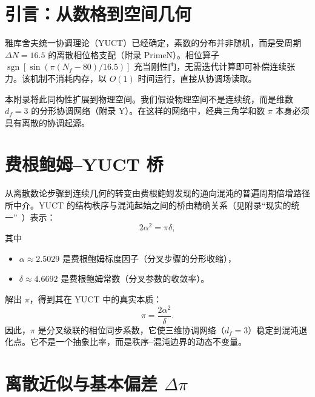 \documentclass[12pt,a4paper]{article}
\newcommand{\df}{d_{\!f}}
\begin{document}
	\tableofcontents
	\newpage
	
	\section{引言：从数格到空间几何}
	
	雅库舍夫统一协调理论（YUCT）已经确定，素数的分布并非随机，而是受周期 $\Delta N = 16.5$ 的离散相位格支配（附录 PrimeN）。相位算子 $\operatorname{sgn}[\sin(\pi(N_f-80)/16.5)]$ 充当刚性门，无需迭代计算即可补偿连续张力。该机制不消耗内存，以 $O(1)$ 时间运行，直接从协调场读取。
	
	本附录将此同构性扩展到物理空间。我们假设物理空间不是连续统，而是维数 $\df=3$ 的分形协调网络（附录 Y）。在这样的网络中，经典三角学和数 $\pi$ 本身必须具有离散的协调起源。
	
	\section{费根鲍姆–YUCT 桥}
	\label{sec:bridge}
	
	从离散数论步骤到连续几何的转变由费根鲍姆发现的通向混沌的普遍周期倍增路径所中介。YUCT 的结构秩序与混沌起始之间的桥由精确关系（见附录“现实的统一”~\cite{UnityReality}）表示：
	\begin{equation}
		2\alpha^2 = \pi\delta,
		\label{eq:bridge}
	\end{equation}
	其中
	\begin{itemize}
		\item $\alpha \approx 2.5029$ 是费根鲍姆标度因子（分叉步骤的分形收缩），
		\item $\delta \approx 4.6692$ 是费根鲍姆常数（分叉参数的收敛率）。
	\end{itemize}
	解出 $\pi$，得到其在 YUCT 中的真实本质：
	\begin{equation}
		\boxed{\pi = \frac{2\alpha^2}{\delta}}.
		\label{eq:pi-from-feigenbaum}
	\end{equation}
	因此，$\pi$ 是分叉级联的相位同步系数，它使三维协调网络（$\df=3$）稳定到混沌退化点。它不是一个抽象比率，而是秩序–混沌边界的动态不变量。
	
	\section{离散近似与基本偏差 $\Delta\pi$}
	\label{sec:delta-pi}
	
\end{document}

